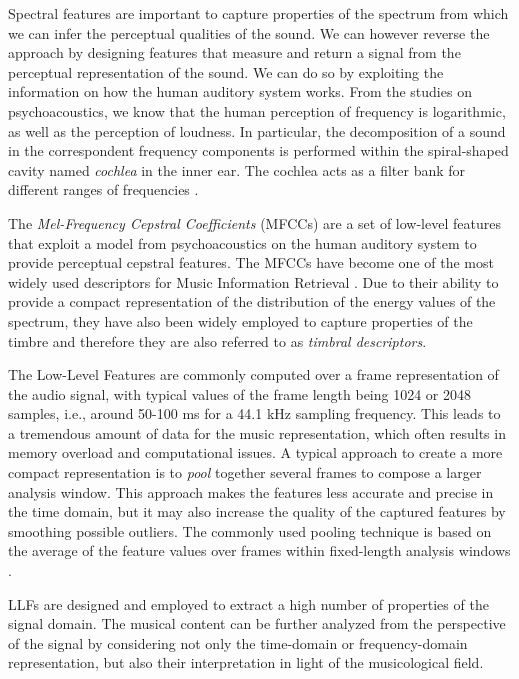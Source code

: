 Spectral features are important to capture properties of the spectrum from which we can infer the perceptual qualities of the sound. We can however reverse the approach by designing features that measure and return a signal from the perceptual representation of the sound. We can do so by exploiting the information on how the human auditory system works. From the studies on psychoacoustics, we know that the human perception of frequency is logarithmic, as well as the perception of loudness. In particular, the decomposition of a sound in the correspondent frequency components is performed within the spiral-shaped cavity named \textit{cochlea} in the inner ear. The cochlea acts as a filter bank for different ranges of frequencies \cite{miotto2011}. 

The \textit{Mel-Frequency Cepstral Coefficients} (MFCCs) are a set of low-level features that exploit a model from psychoacoustics on the human auditory system to provide perceptual cepstral features. The MFCCs have become one of the most widely used descriptors for Music Information Retrieval \cite{muller2007information, muller2015fundamentals}. Due to their ability to provide a compact representation of the distribution of the energy values of the spectrum, they have also been widely employed to capture properties of the timbre and therefore they are also referred to as \textit{timbral descriptors}. 

The Low-Level Features are commonly computed over a frame representation of the audio signal, with typical values of the frame length being 1024 or 2048 samples, i.e., around 50-100 ms for a 44.1 kHz sampling frequency. This leads to a tremendous amount of data for the music representation, which often results in memory overload and computational issues. A typical approach to create a more compact representation is to \textit{pool} together several frames to compose a larger analysis window. This approach makes the features less accurate and precise in the time domain, but it may also increase the quality of the captured features by smoothing possible outliers. The commonly used pooling technique is based on the average of the feature values over frames within fixed-length analysis windows \cite{Bestagini2013,zanoni2015training}. 

LLFs are designed and employed to extract a high number of properties of the signal domain. The musical content can be further analyzed from the perspective of the signal by considering not only the time-domain or frequency-domain representation, but also their interpretation in light of the musicological field.

